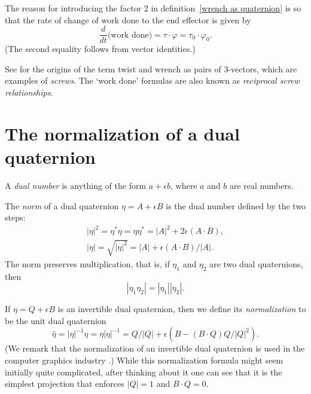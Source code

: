 \documentclass[reqno,12pt]{amsart}
\begin{document}
The reason for introducing the factor $2$ in definition~\eqref{wrench as quaternion} is so that the rate of change of work done to the end effector is given by
\begin{equation}
\label{dot h tau varphi}
\frac{d}{dt} \text{(work done)} = \tau \cdot \varphi = \tau_0 \cdot \varphi_0 .
\end{equation}
(The second equality follows from vector identities.)

See \cite{ball} for the origins of the term twist and wrench as pairs of 3-vectors, which are examples of \emph{screws}.  The `work done' formulas are also known as \emph{reciprocal screw relationships}.

\section{The normalization of a dual quaternion}

A \emph{dual number} is anything of the form $a + \epsilon b$, where $a$ and $b$ are real numbers.

The \emph{norm} of a dual quaternion $\eta = A + \epsilon B$ is the dual number defined by the two steps:
\begin{gather}
|\eta|^2 = \eta^* \eta = \eta \eta^* = |A|^2 + 2 \epsilon (A \cdot B) ,\\
\label{norm}
|\eta| = \sqrt{|\eta|^2} = |A| + \epsilon (A \cdot B) / |A| .
\end{gather}
The norm preserves multiplication, that is, if $\eta_1$ and $\eta_2$ are two dual quaternions, then
\begin{equation}
|\eta_1 \eta_2| = |\eta_1| |\eta_2| .
\end{equation}

If $\eta = Q + \epsilon B$ is an invertible dual quaternion, then we define its \emph{normalization} to be the unit dual quaternion
\begin{equation}
\label{normalize}
\widehat \eta = |\eta|^{-1}\eta = \eta|\eta|^{-1}
= Q/|Q| + \epsilon (B - (B\cdot Q) Q/|Q|^2) .
\end{equation}
(We remark that the normalization of an invertible dual quaternion is used in the computer graphics industry \cite{kavan-et-al, kavan-et-al-2}.)  While this normalization formula might seem initially quite complicated, after thinking about it one can see that it is the simplest projection that enforces $|Q| = 1$ and $B\cdot Q = 0$.
\end{document}
